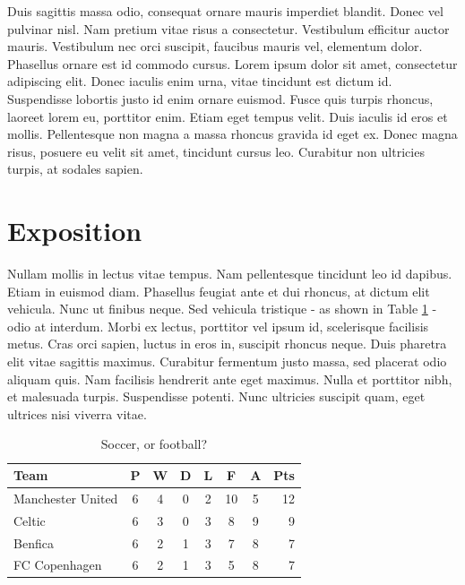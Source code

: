 \documentclass[acmtog]{acmart}
\begin{document}
Duis sagittis massa odio, consequat ornare mauris imperdiet blandit. \cite{levoy:2000:TDM} Donec vel pulvinar nisl. Nam pretium vitae risus a consectetur. \cite{sako:2001:SSB, fedkiw:2001:VSO, Jobs95} Vestibulum efficitur auctor mauris. Vestibulum nec orci suscipit, faucibus mauris vel, elementum dolor. Phasellus ornare est id commodo cursus. Lorem ipsum dolor sit amet, consectetur adipiscing elit. Donec iaculis enim urna, vitae tincidunt est dictum id. Suspendisse lobortis justo id enim ornare euismod. Fusce quis turpis rhoncus, laoreet lorem eu, porttitor enim. \cite{kartch:2000:ERA, yee:2000:SSA, parke:1996:CFA} Etiam eget tempus velit. Duis iaculis id eros et mollis. Pellentesque non magna a massa rhoncus gravida id eget ex. Donec magna risus, posuere eu velit sit amet, tincidunt cursus leo. Curabitur non ultricies turpis, at sodales sapien.

\section{Exposition}

Nullam mollis in lectus vitae tempus. Nam pellentesque tincidunt leo id dapibus. Etiam in euismod diam. \cite{ceres-solver, Asaro:1976:POT} Phasellus feugiat ante et dui rhoncus, at dictum elit vehicula. Nunc ut finibus neque. Sed vehicula tristique - as shown in Table \ref{soccer} - odio at interdum. Morbi ex lectus, porttitor vel ipsum id, scelerisque facilisis metus. Cras orci sapien, luctus in eros in, suscipit rhoncus neque. Duis pharetra elit vitae sagittis maximus. Curabitur fermentum justo massa, sed placerat odio aliquam quis. Nam facilisis hendrerit ante eget maximus. Nulla et porttitor nibh, et malesuada turpis. Suspendisse potenti. Nunc ultricies suscipit quam, eget ultrices nisi viverra vitae.

\begin{table}[ht]
\begin{center}
    \caption{Soccer, or football?}
\label{soccer}
\begin{tabular}{l*{6}{c}r}
Team              & P & W & D & L & F  & A & Pts \\
\hline
Manchester United & 6 & 4 & 0 & 2 & 10 & 5 & 12  \\
Celtic            & 6 & 3 & 0 & 3 &  8 & 9 &  9  \\
Benfica           & 6 & 2 & 1 & 3 &  7 & 8 &  7  \\
FC Copenhagen     & 6 & 2 & 1 & 3 &  5 & 8 &  7  \\
\end{tabular}
\end{center}
\end{table}
\end{document}
